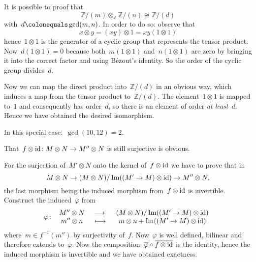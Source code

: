 \begin{exercise}
  It is possible to proof that
  \begin{equation}
    \mathbb{Z}/(m)\otimes_\mathbb{Z}\mathbb{Z}/(n)\cong\mathbb{Z}/(d)
  \end{equation}
  with~$d\colonequals\gcd(m,n)$. In order to do so: observe that
  \begin{equation}
    x\otimes y=\left( xy \right)\otimes 1=xy\left( 1\otimes 1 \right)
  \end{equation}
  hence~$1\otimes 1$ is the generator of a cyclic group that represents the tensor product. Now~$d(1\otimes 1)=0$ because both~$m(1\otimes 1)$ and~$n(1\otimes 1)$ are zero by bringing it into the correct factor and using B\'ezout's identity. So the order of the cyclic group divides~$d$.
  
  Now we can map the direct product into~$\mathbb{Z}/(d)$ in an obvious way, which induces a map from the tensor product to~$\mathbb{Z}/(d)$. The element~$1\otimes 1$ is mapped to~$1$ and consequently has order~$d$, so there is an element of order \emph{at least~$d$}. Hence we have obtained the desired isomorphism.

  In this special case:~$\gcd(10,12)=2$.
\end{exercise}

\begin{exercise} %
  That~$f\otimes\mathrm{id}\colon M\otimes N\to M''\otimes N$ is still surjective is obvious.

  For the surjection of~$M'\otimes N$ onto the kernel of~$f\otimes\mathrm{id}$ we have to prove that in
  \begin{equation}
    M\otimes N\to (M\otimes N)/\operatorname{Im}((M'\to M)\otimes\mathrm{id})\to M''\otimes N,
  \end{equation}
  the last morphism being the induced morphism from~$f\otimes\mathrm{id}$ is invertible. Construct the induced~$\overline{\varphi}$ from
  \begin{equation}
    \map{\varphi}{M''\otimes N}{(M\otimes N)/\Image((M'\to M)\otimes\identity)}{m''\otimes n}{m\otimes n+\Image((M'\to M)\otimes\identity)}
  \end{equation}
  where~$m\in f^{-1}(m'')$ by surjectivity of~$f$. Now~$\varphi$ is well defined, bilinear and therefore extends to~$\overline{\varphi}$. Now the composition~$\overline{\varphi}\circ\overline{f\otimes\mathrm{id}}$ is the identity, hence the induced morphism is invertible and we have obtained exactness.
\end{exercise}

